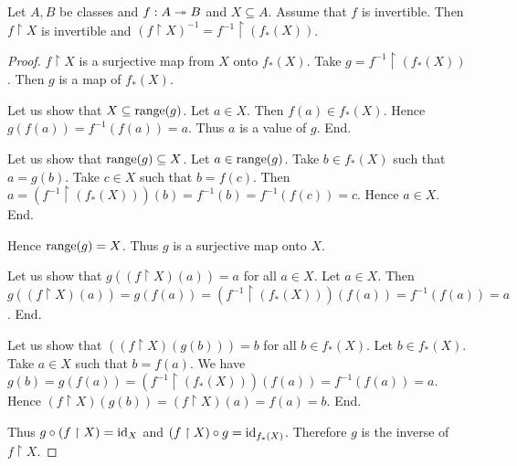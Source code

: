 \documentclass[10pt]{article}
\begin{document}
  \begin{forthel}
    \begin{proposition}
      Let $A, B$ be classes and $f : A \twoheadrightarrow B$ and $X \subseteq A$.
      Assume that $f$ is invertible.
      Then $f \restriction X$ is invertible and $(f\restriction X)^{-1} = f^{-1} \restriction (f_{*}(X))$.
    \end{proposition}
    \begin{proof}
      $f \restriction X$ is a surjective map from $X$ onto $f_{*}(X)$.
      Take $g = f^{-1} \restriction (f_{*}(X))$.
      Then $g$ is a map of $f_{*}(X)$.

      Let us show that $X \subseteq \textrm{range}(g)$.
        Let $a \in X$.
        Then $f(a) \in f_{*}(X)$.
        Hence $g(f(a)) = f^{-1}(f(a)) = a$.
        Thus $a$ is a value of $g$.
      End.

      Let us show that $\textrm{range}(g) \subseteq X$.
        Let $a \in \textrm{range}(g)$.
        Take $b \in f_{*}(X)$ such that $a = g(b)$.
        Take $c \in X$ such that $b = f(c)$.
        Then $a
          = (f^{-1} \restriction (f_{*}(X)))(b)
          = f^{-1}(b)
          = f^{-1}(f(c))
          = c$.
        Hence $a \in X$.
      End.

      Hence $\textrm{range}(g) = X$.
      Thus $g$ is a surjective map onto $X$.

      Let us show that $g((f \restriction X)(a)) = a$ for all $a \in X$.
        Let $a \in X$.
        Then $g((f \restriction X)(a))
          = g(f(a))
          = (f^{-1} \restriction (f_{*}(X)))(f(a))
          = f^{-1}(f(a))
          = a$.
      End.

      Let us show that $((f \restriction X)(g(b))) = b$ for all $b \in f_{*}(X)$.
        Let $b \in f_{*}(X)$.
        Take $a \in X$ such that $b = f(a)$.
        We have $g(b)
          = g(f(a))
          = (f^{-1} \restriction (f_{*}(X)))(f(a))
          = f^{-1}(f(a))
          = a$.
        Hence $(f \restriction X)(g(b))
          = (f \restriction X)(a)
          = f(a)
          = b$.
      End.

      Thus $g \circ (f \restriction X) = \textrm{id}_{X}$ and $(f \restriction X) \circ g = \textrm{id}_{f_{*}(X)}$.
      Therefore $g$ is the inverse of $f \restriction X$.
    \end{proof}
  \end{forthel}
\end{document}
